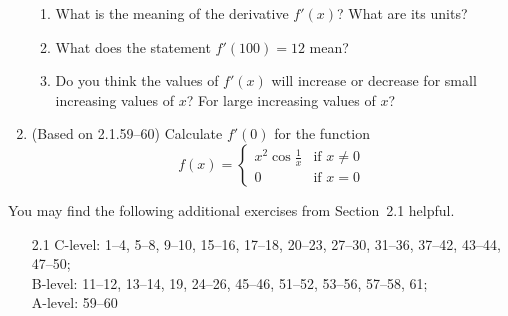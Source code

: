 \documentclass{article}
\newcommand{\ds}{\displaystyle}
\begin{document}
\begin{enumerate}
\begin{enumerate}
  \item What is the meaning of the derivative $f'(x)$?  What are its
    units?
  \item What does the statement $f'(100)=12$ mean?
  \item Do you think the values of $f'(x)$ will increase or decrease
    for small increasing values of $x$?  For large increasing values
    of $x$?
  \end{enumerate}
\item (Based on 2.1.59--60) %
  Calculate $f'(0)$ for the function
  \begin{equation*}
    f(x) = \begin{cases}
      \ds x^2 \cos \frac{1}{x} & \mbox{if $x\ne 0$} \\
      \ds 0                    & \mbox{if $x=0$}
    \end{cases}
  \end{equation*}
\end{enumerate}

\noindent
You may find the following additional exercises from Section~2.1 helpful.
\begin{itemize}
\item[2.1]
  C-level: 1--4, 5--8, 9--10, 15--16, 17--18, 20--23, 27--30,
    31--36, 37--42, 43--44, 47--50; \\
  B-level: 11--12, 13--14, 19, 24--26, 45--46, 51--52, 53--56,
    57--58, 61; \\
  A-level: 59--60
\end{itemize}
\end{document}
